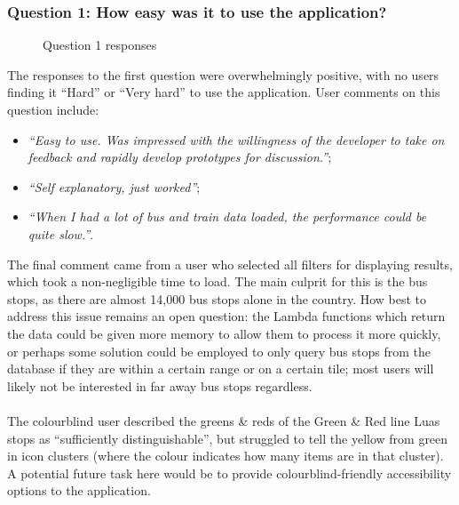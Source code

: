 \documentclass[a4paper,11pt]{report}
\begin{document}
\subsubsection{Question 1: How easy was it to use the application?}
\begin{figure}[H]
    \centering
    \caption{Question 1 responses}
\end{figure}

The responses to the first question were overwhelmingly positive, with no users finding it ``Hard'' or ``Very hard'' to use the application.
User comments on this question include:
\begin{itemize}
    \item   \textit{``Easy to use. Was impressed with the willingness of the developer to take on feedback and rapidly develop prototypes for discussion.''};
    \item   \textit{``Self explanatory, just worked''};
    \item   \textit{``When I had a lot of bus and train data loaded, the performance could be quite slow.''}.
\end{itemize}

The final comment came from a user who selected all filters for displaying results, which took a non-negligible time to load.
The main culprit for this is the bus stops, as there are almost 14,000 bus stops alone in the country.
How best to address this issue remains an open question: the Lambda functions which return the data could be given more memory to allow them to process it more quickly, or perhaps some solution could be employed to only query bus stops from the database if they are within a certain range or on a certain tile;
most users will likely not be interested in far away bus stops regardless.
\\\\
The colourblind user described the greens \& reds of the Green \& Red line Luas stops as ``sufficiently distinguishable'', but struggled to tell the yellow from green in icon clusters (where the colour indicates how many items are in that cluster).
A potential future task here would be to provide colourblind-friendly accessibility options to the application.
\end{document}
